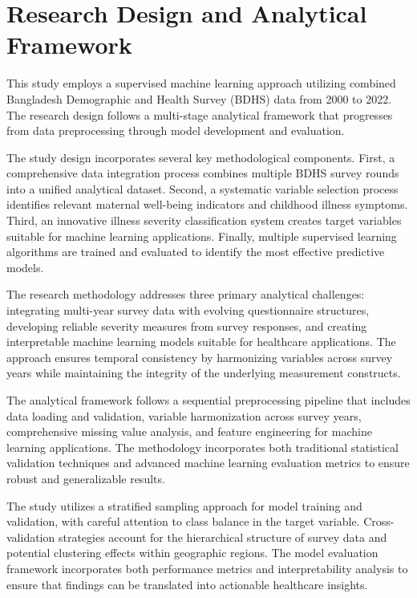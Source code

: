\documentclass[12pt]{report}
\begin{document}
\section{Research Design and Analytical Framework}

This study employs a supervised machine learning approach utilizing combined Bangladesh Demographic and Health Survey (BDHS) data from 2000 to 2022. The research design follows a multi-stage analytical framework that progresses from data preprocessing through model development and evaluation.

The study design incorporates several key methodological components. First, a comprehensive data integration process combines multiple BDHS survey rounds into a unified analytical dataset. Second, a systematic variable selection process identifies relevant maternal well-being indicators and childhood illness symptoms. Third, an innovative illness severity classification system creates target variables suitable for machine learning applications. Finally, multiple supervised learning algorithms are trained and evaluated to identify the most effective predictive models.

The research methodology addresses three primary analytical challenges: integrating multi-year survey data with evolving questionnaire structures, developing reliable severity measures from survey responses, and creating interpretable machine learning models suitable for healthcare applications. The approach ensures temporal consistency by harmonizing variables across survey years while maintaining the integrity of the underlying measurement constructs.

The analytical framework follows a sequential preprocessing pipeline that includes data loading and validation, variable harmonization across survey years, comprehensive missing value analysis, and feature engineering for machine learning applications. The methodology incorporates both traditional statistical validation techniques and advanced machine learning evaluation metrics to ensure robust and generalizable results.

The study utilizes a stratified sampling approach for model training and validation, with careful attention to class balance in the target variable. Cross-validation strategies account for the hierarchical structure of survey data and potential clustering effects within geographic regions. The model evaluation framework incorporates both performance metrics and interpretability analysis to ensure that findings can be translated into actionable healthcare insights.
\end{document}
